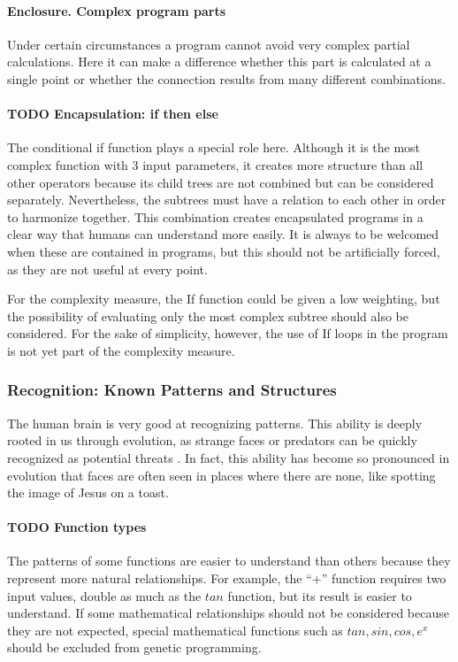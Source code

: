 \paragraph{Enclosure. Complex program parts} 
Under certain circumstances a program cannot avoid very complex partial calculations. Here it can make a difference whether this part is calculated at a single point or whether the connection results from many different combinations.

\paragraph{TODO Encapsulation: if then else}
The conditional if function plays a special role here. Although it is the most complex function with 3 input parameters, it creates more structure than all other operators because its child trees are not combined but can be considered separately. Nevertheless, the subtrees must have a relation to each other in order to harmonize together. This combination creates encapsulated programs in a clear way that humans can understand more easily. It is always to be welcomed when these are contained in programs, but this should not be artificially forced, as they are not useful at every point.

For the complexity measure, the If function could be given a low weighting, but the possibility of evaluating only the most complex subtree should also be considered. For the sake of simplicity, however, the use of If loops in the program is not yet part of the complexity measure.

\subsubsection{Recognition: Known Patterns and Structures}

The human brain is very good at recognizing patterns. This ability is deeply rooted in us through evolution, as strange faces or predators can be quickly recognized as potential threats \cite{humanPatternRecognition}. In fact, this ability has become so pronounced in evolution that faces are often seen in places where there are none, like spotting the image of Jesus on a toast.

\paragraph{TODO Function types}
The patterns of some functions are easier to understand than others because they represent more natural relationships. For example, the ``+'' function requires two input values, double as much as the $tan$ function, but its result is easier to understand. If some mathematical relationships should not be considered because they are not expected, special mathematical functions such as $tan, sin, cos, e^x$ should be excluded from genetic programming.

